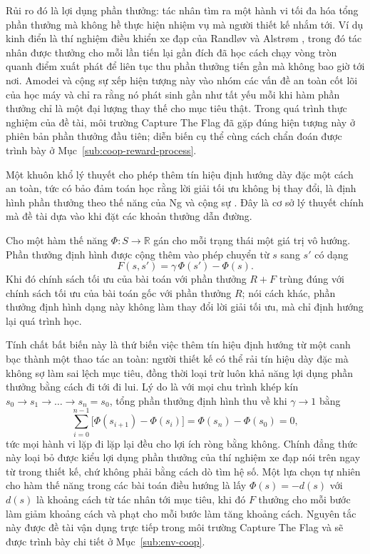 \indent Rủi ro đó là lợi dụng phần thưởng: tác nhân tìm ra một hành vi tối đa hóa
tổng phần thưởng mà không hề thực hiện nhiệm vụ mà người thiết kế nhắm tới. Ví dụ kinh
điển là thí nghiệm điều khiển xe đạp của Randløv và Alstrøm \cite{randlov1998learning},
trong đó tác nhân được thưởng cho mỗi lần tiến lại gần đích đã học cách chạy vòng tròn
quanh điểm xuất phát để liên tục thu phần thưởng tiến gần mà không bao giờ tới nơi.
Amodei và cộng sự \cite{amodei2016concrete} xếp hiện tượng này vào nhóm các vấn đề an
toàn cốt lõi của học máy và chỉ ra rằng nó phát sinh gần như tất yếu mỗi khi hàm phần
thưởng chỉ là một đại lượng thay thế cho mục tiêu thật. Trong quá trình thực
nghiệm của đề tài, môi trường Capture The Flag đã gặp đúng hiện tượng này ở phiên bản
phần thưởng đầu tiên; diễn biến cụ thể cùng cách chẩn đoán được trình bày ở
Mục~\ref{sub:coop-reward-process}.

\indent Một khuôn khổ lý thuyết cho phép thêm tín hiệu định hướng dày đặc một cách
an toàn, tức có bảo đảm toán học rằng lời giải tối ưu không bị thay đổi, là
định hình phần thưởng theo thế năng của Ng và cộng sự \cite{ng1999policy}. Đây
là cơ sở lý thuyết chính mà đề tài dựa vào khi đặt các khoản thưởng dẫn đường.

\begin{dn}
\label{dn:pbrs}
Cho một hàm thế năng $\Phi: S \to \mathbb{R}$ gán cho mỗi trạng thái một giá trị vô
hướng. Phần thưởng định hình được cộng thêm vào phép chuyển từ $s$ sang $s'$ có dạng
\[
F(s, s') = \gamma\, \Phi(s') - \Phi(s).
\]
Khi đó chính sách tối ưu của bài toán với phần thưởng $R + F$ trùng đúng với chính sách
tối ưu của bài toán gốc với phần thưởng $R$; nói cách khác, phần thưởng định hình dạng
này không làm thay đổi lời giải tối ưu, mà chỉ định hướng lại quá trình học.
\end{dn}

\indent Tính chất bất biến này là thứ biến việc thêm tín hiệu định hướng từ một canh
bạc thành một thao tác an toàn: người thiết kế có thể rải tín hiệu dày đặc mà không sợ
làm sai lệch mục tiêu, đồng thời loại trừ luôn khả năng lợi dụng phần thưởng bằng cách
đi tới đi lui. Lý do là với mọi
chu trình khép kín $s_0 \to s_1 \to \dots \to s_n = s_0$, tổng phần thưởng định hình
thu về khi $\gamma \to 1$ bằng
\begin{equation}
\sum_{i=0}^{n-1} \bigl[\Phi(s_{i+1}) - \Phi(s_i)\bigr] = \Phi(s_n) - \Phi(s_0) = 0 ,
\label{eq:pbrs-cycle}
\end{equation}
tức mọi hành vi lặp đi lặp lại đều cho lợi ích ròng bằng không. Chính đẳng thức này
loại bỏ được kiểu lợi dụng phần thưởng của thí nghiệm xe đạp nói trên ngay từ trong
thiết kế, chứ không phải bằng cách dò tìm hệ số. Một lựa chọn tự nhiên cho hàm thế năng
trong các bài toán điều hướng là lấy $\Phi(s) = -d(s)$ với $d(s)$ là khoảng cách từ tác
nhân tới mục tiêu, khi đó $F$ thưởng cho mỗi bước làm giảm khoảng cách và phạt cho mỗi
bước làm tăng khoảng cách. Nguyên tắc này được đề tài vận dụng trực tiếp trong môi
trường Capture The Flag và sẽ được trình bày chi tiết ở Mục~\ref{sub:env-coop}.

